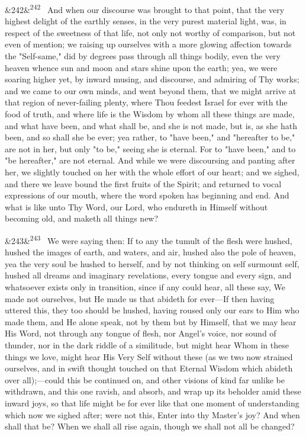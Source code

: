 \documentclass[12pt]{article}
\newcommand{\para}[1][]{\par\noindent\ifx&#1&\else\textsuperscript{\footnotesize #1}~\fi}
\begin{document}
\para[242] And when our discourse was brought to that point, that the very highest delight of the earthly senses, in the very purest material light, was, in respect of the sweetness of that life, not only not worthy of comparison, but not even of mention; we raising up ourselves with a more glowing affection towards the "Self-same," did by degrees pass through all things bodily, even the very heaven whence sun and moon and stars shine upon the earth; yea, we were soaring higher yet, by inward musing, and discourse, and admiring of Thy works; and we came to our own minds, and went beyond them, that we might arrive at that region of never-failing plenty, where Thou feedest Israel for ever with the food of truth, and where life is the Wisdom by whom all these things are made, and what have been, and what shall be, and she is not made, but is, as she hath been, and so shall she be ever; yea rather, to "have been," and "hereafter to be," are not in her, but only "to be," seeing she is eternal. For to "have been," and to "be hereafter," are not eternal. And while we were discoursing and panting after her, we slightly touched on her with the whole effort of our heart; and we sighed, and there we leave bound the first fruits of the Spirit; and returned to vocal expressions of our mouth, where the word spoken has beginning and end. And what is like unto Thy Word, our Lord, who endureth in Himself without becoming old, and maketh all things new?

\para[243] We were saying then: If to any the tumult of the flesh were hushed, hushed the images of earth, and waters, and air, hushed also the pole of heaven, yea the very soul be hushed to herself, and by not thinking on self surmount self, hushed all dreams and imaginary revelations, every tongue and every sign, and whatsoever exists only in transition, since if any could hear, all these say, We made not ourselves, but He made us that abideth for ever---If then having uttered this, they too should be hushed, having roused only our ears to Him who made them, and He alone speak, not by them but by Himself, that we may hear His Word, not through any tongue of flesh, nor Angel's voice, nor sound of thunder, nor in the dark riddle of a similitude, but might hear Whom in these things we love, might hear His Very Self without these (as we two now strained ourselves, and in swift thought touched on that Eternal Wisdom which abideth over all);---could this be continued on, and other visions of kind far unlike be withdrawn, and this one ravish, and absorb, and wrap up its beholder amid these inward joys, so that life might be for ever like that one moment of understanding which now we sighed after; were not this, Enter into thy Master's joy? And when shall that be? When we shall all rise again, though we shall not all be changed?
\end{document}
